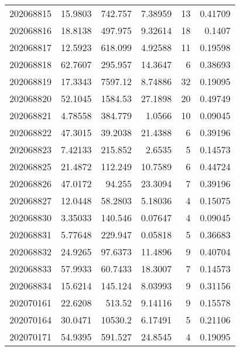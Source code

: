\begin{tabular}{rrrrrr}
 202068815 &         15.9803  &      742.757  &            7.38959 &          13 & 0.41709 \\
 202068816 &         18.8138  &      497.975  &            9.32614 &          18 & 0.1407  \\
 202068817 &         12.5923  &      618.099  &            4.92588 &          11 & 0.19598 \\
 202068818 &         62.7607  &      295.957  &           14.3647  &           6 & 0.38693 \\
 202068819 &         17.3343  &     7597.12   &            8.74886 &          32 & 0.19095 \\
 202068820 &         52.1045  &     1584.53   &           27.1898  &          20 & 0.49749 \\
 202068821 &          4.78558 &      384.779  &            1.0566  &          10 & 0.09045 \\
 202068822 &         47.3015  &       39.2038 &           21.4388  &           6 & 0.39196 \\
 202068823 &          7.42133 &      215.852  &            2.6535  &           5 & 0.14573 \\
 202068825 &         21.4872  &      112.249  &           10.7589  &           6 & 0.44724 \\
 202068826 &         47.0172  &       94.255  &           23.3094  &           7 & 0.39196 \\
 202068827 &         12.0448  &       58.2803 &            5.18036 &           4 & 0.15075 \\
 202068830 &          3.35033 &      140.546  &            0.07647 &           4 & 0.09045 \\
 202068831 &          5.77648 &      229.947  &            0.05818 &           5 & 0.36683 \\
 202068832 &         24.9265  &       97.6373 &           11.4896  &           9 & 0.40704 \\
 202068833 &         57.9933  &       60.7433 &           18.3007  &           7 & 0.14573 \\
 202068834 &         15.6214  &      145.124  &            8.03993 &           9 & 0.31156 \\
 202070161 &         22.6208  &      513.52   &            9.14116 &           9 & 0.15578 \\
 202070164 &         30.0471  &    10530.2    &            6.17491 &           5 & 0.21106 \\
 202070171 &         54.9395  &      591.527  &           24.8545  &           4 & 0.19095 \\

\end{tabular}
